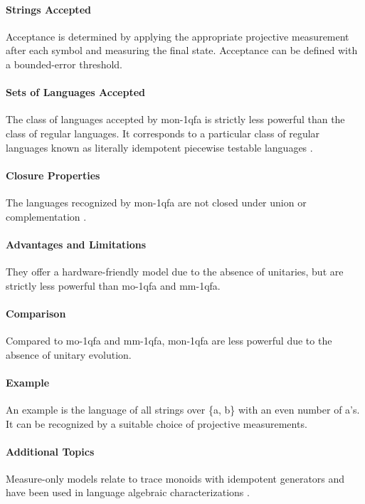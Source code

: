 \paragraph{Strings Accepted}
Acceptance is determined by applying the appropriate projective measurement after each symbol and measuring the final state. Acceptance can be defined with a bounded-error threshold.

\paragraph{Sets of Languages Accepted}
The class of languages accepted by \gls{mon-1qfa} is strictly less powerful than the class of regular languages. It corresponds to a particular class of regular languages known as literally idempotent piecewise testable languages \cite{bertoni2010trace}.

\paragraph{Closure Properties}
The languages recognized by \gls{mon-1qfa} are not closed under union or complementation \cite{bertoni2010trace}.

\paragraph{Advantages and Limitations}
They offer a hardware-friendly model due to the absence of unitaries, but are strictly less powerful than \gls{mo-1qfa} and \gls{mm-1qfa}.

\paragraph{Comparison}
Compared to \gls{mo-1qfa} and \gls{mm-1qfa}, \gls{mon-1qfa} are less powerful due to the absence of unitary evolution.

\paragraph{Example}
An example is the language of all strings over \{a, b\} with an even number of a's. It can be recognized by a suitable choice of projective measurements.

\paragraph{Additional Topics}
Measure-only models relate to trace monoids with idempotent generators and have been used in language algebraic characterizations \cite{comin2013extended, bertoni2010trace}.

